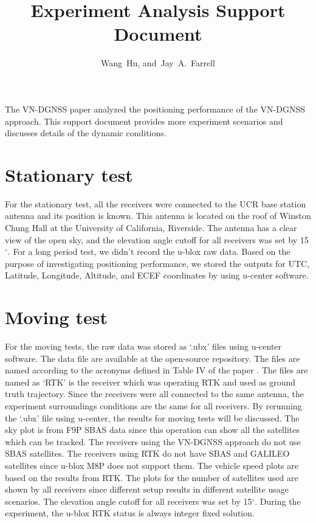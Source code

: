 \documentclass[letterpaper, 10 pt,onecolumn]{article}
\begin{document}
	\title{Experiment Analysis Support Document}
	\author{Wang~Hu,
		and~Jay~A.~Farrell
	}
	\maketitle
	
	The VN-DGNSS paper \cite{hu2021using} analyzed the positioning performance of the VN-DGNSS approach. This support document provides more experiment scenarios and discusses details of the dynamic conditions.
	
	\section{Stationary test}
	For the stationary test, all the receivers were connected to the UCR base station antenna and its position is known. 
	This antenna is located on the roof of Winston Chung Hall at the University of California, Riverside. 
	The antenna has a clear view of the open sky, and the elevation angle cutoff for all receivers was set by 15$^\circ$. 
	For a long period test, we didn't record the u-blox raw data. Based on the purpose of investigating positioning performance, we stored the outputs for UTC, Latitude, Longitude, Altitude, and ECEF coordinates by using u-center software.
	
	\section{Moving test}
	For the moving tests, the raw data was stored as `.ubx' files using u-center software. The data file are available at the open-source repository. The files are named according to the acronyms defined in Table IV of the paper \cite{hu2021using}. The files are named as `RTK' is the receiver which was operating RTK and used as ground truth trajectory. Since the receivers were all connected to the same antenna, the experiment surroundings conditions are the same for all receivers. By rerunning the `.ubx' file using u-center, the results for moving tests will be discussed. The sky plot is from F9P SBAS data since this operation can show all the satellites which can be tracked. The receivers using the VN-DGNSS approach do not use SBAS satellites. The receivers using RTK do not have SBAS and GALILEO satellites since u-blox M8P does not support them. The vehicle speed plots are based on the results from RTK. The plots for the number of satellites used are shown by all receivers since different setup results in different satellite usage scenarios. The elevation angle cutoff for all receivers was set by 15$^\circ$. During the experiment, the u-blox RTK status is always integer fixed solution.
	
\end{document}
